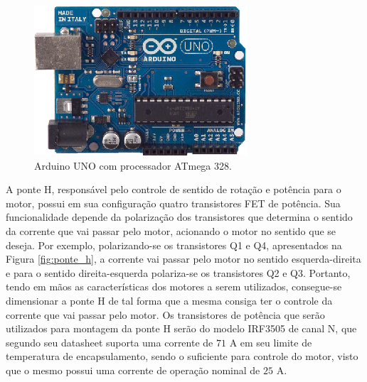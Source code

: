 \begin{figure}[H]
  \centering
    \includegraphics[width=\textwidth]{figuras/arduino.eps}
  \caption{Arduino UNO com processador ATmega 328.}
  \label{fig:arduino}
\end{figure}

A ponte H, responsável pelo controle de sentido de rotação e 
potência para o motor, possui em sua configuração quatro 
transistores FET de potência. Sua funcionalidade depende 
da polarização dos transistores que determina o sentido da corrente 
que vai passar pelo motor, acionando o motor no sentido que se deseja. 
Por exemplo, polarizando-se os transistores Q1 e Q4, apresentados 
na Figura \ref{fig:ponte_h}, a corrente vai passar pelo motor no 
sentido esquerda-direita e para o sentido direita-esquerda 
polariza-se os transistores Q2 e Q3. Portanto, tendo em mãos as 
características dos motores a serem utilizados, consegue-se 
dimensionar a ponte H de tal forma que a mesma consiga ter o 
controle da corrente que vai passar pelo motor. Os transistores 
de potência que serão utilizados para montagem da ponte H serão do 
modelo IRF3505 de canal N, que segundo seu datasheet suporta uma 
corrente de $71$ A em seu limite de temperatura de encapsulamento, 
sendo o suficiente para controle do motor, visto que o mesmo 
possui uma corrente de operação nominal de $25$ A.

